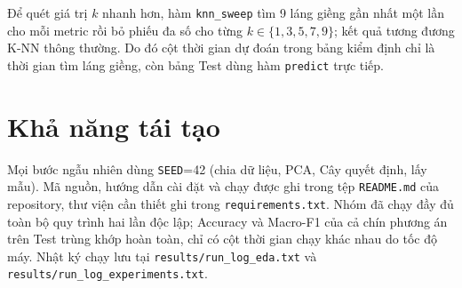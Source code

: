 Để quét giá trị $k$ nhanh hơn, hàm \texttt{knn\_sweep} tìm 9 láng giềng gần nhất một lần cho mỗi metric rồi bỏ phiếu đa số cho từng $k \in \{1,3,5,7,9\}$; kết quả tương đương K-NN thông thường. Do đó cột thời gian dự đoán trong bảng kiểm định chỉ là thời gian tìm láng giềng, còn bảng Test dùng hàm \texttt{predict} trực tiếp.

\section{Khả năng tái tạo}

Mọi bước ngẫu nhiên dùng \texttt{SEED}=42 (chia dữ liệu, PCA, Cây quyết định, lấy mẫu). Mã nguồn, hướng dẫn cài đặt và chạy được ghi trong tệp \texttt{README.md} của repository, thư viện cần thiết ghi trong \texttt{requirements.txt}. Nhóm đã chạy đầy đủ toàn bộ quy trình hai lần độc lập; Accuracy và Macro-F1 của cả chín phương án trên Test trùng khớp hoàn toàn, chỉ có cột thời gian chạy khác nhau do tốc độ máy. Nhật ký chạy lưu tại \texttt{results/run\_log\_eda.txt} và \texttt{results/run\_log\_experiments.txt}.
